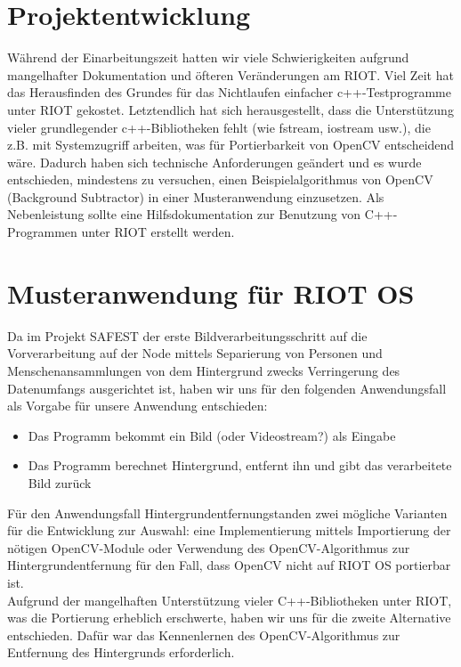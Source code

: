 \documentclass[10pt,a4paper]{article}
\begin{document}
\section{Projektentwicklung}
Während der Einarbeitungszeit hatten wir viele Schwierigkeiten aufgrund mangelhafter Dokumentation und öfteren Veränderungen am RIOT. Viel Zeit hat das Herausfinden des Grundes für das Nichtlaufen einfacher c++-Testprogramme unter RIOT gekostet. Letztendlich hat sich herausgestellt, dass die Unterstützung vieler grundlegender c++-Bibliotheken fehlt (wie fstream, iostream usw.), die z.B. mit Systemzugriff arbeiten, was für Portierbarkeit von OpenCV entscheidend wäre. Dadurch haben sich technische Anforderungen geändert und es wurde entschieden, mindestens zu versuchen, einen Beispielalgorithmus von OpenCV (Background Subtractor) in einer Musteranwendung einzusetzen. Als Nebenleistung sollte eine Hilfsdokumentation zur Benutzung von C++-Programmen unter RIOT erstellt werden. 

\newpage
\section{Musteranwendung für RIOT OS}

Da im Projekt SAFEST der erste Bildverarbeitungsschritt auf die Vorverarbeitung auf der Node mittels Separierung von Personen und Menschenansammlungen von dem Hintergrund zwecks Verringerung des Datenumfangs ausgerichtet ist, haben wir uns für den folgenden Anwendungsfall als Vorgabe für unsere Anwendung entschieden: 

\begin{itemize}
\item Das Programm bekommt ein Bild (oder Videostream?) als Eingabe
\item Das Programm berechnet Hintergrund, entfernt ihn und gibt das verarbeitete Bild zurück
\end{itemize}

Für den Anwendungsfall \glqq Hintergrundentfernung\grqq standen zwei mögliche Varianten für die Entwicklung zur Auswahl: eine Implementierung mittels Importierung der nötigen OpenCV-Module oder Verwendung des OpenCV-Algorithmus zur Hintergrundentfernung für den Fall, dass OpenCV nicht auf RIOT OS portierbar ist. \\

Aufgrund der mangelhaften Unterstützung vieler C++-Bibliotheken unter RIOT, was die Portierung erheblich erschwerte, haben wir uns für die zweite Alternative entschieden. Dafür war das Kennenlernen des OpenCV-Algorithmus zur Entfernung des Hintergrunds erforderlich. \\
\end{document}
